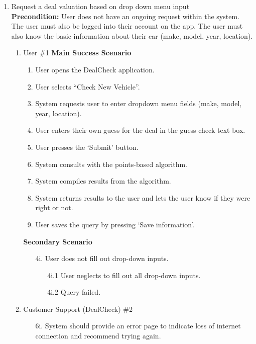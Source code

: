 \documentclass[]{article}
\begin{document}
\begin{enumerate}[{\bf {BE}1.}]

    \item Request a deal valuation based on drop down menu input \\    
	\textbf{Precondition:} User does not have an ongoing request within the system. The user must also be logged into their account on the app. The user must also know the basic information about their car (make, model, year, location).
    \begin{enumerate}[{\bf VP1.}]
      \item User \#1
        \textbf{Main Success Scenario}
        \begin{enumerate}[1.]
          \item User opens the DealCheck application.
          \item User selects “Check New Vehicle”.
          \item System requests user to enter dropdown menu fields (make, model, year, location).
          \item User enters their own guess for the deal in the guess check text box.
          \item User presses the ‘Submit’ button.
          \item System consults with the points-based algorithm.
          \item System compiles results from the algorithm.
          \item System returns results to the user and lets the user know if they were right or not.
          \item User saves the query by pressing ‘Save information’.
        \end{enumerate}
        \textbf{Secondary Scenario}
        \begin{enumerate}
          \item[4i.] User does not fill out drop-down inputs.
          \begin{enumerate}
            \item[4i.1] User neglects to fill out all drop-down inputs.
            \item[4i.2] Query failed.
          \end{enumerate}
        \end{enumerate}
      \item Customer Support (DealCheck) \#2
        \begin{enumerate}
          \item[6i.] System should provide an error page to indicate loss of internet connection and recommend trying again.

\end{enumerate}
\end{enumerate}
\end{enumerate}
\end{document}
